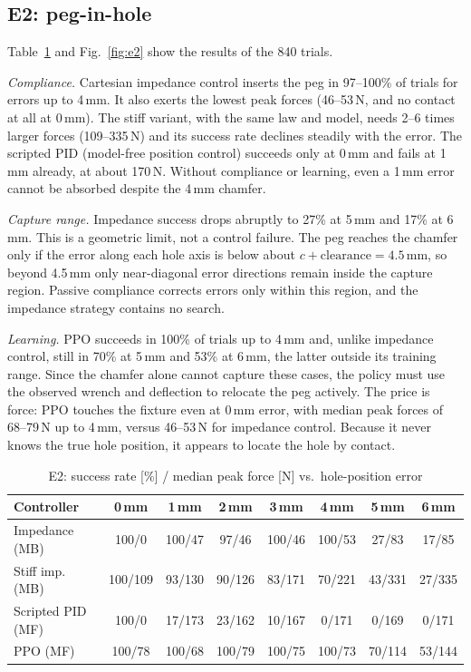 \documentclass[conference]{IEEEtran}
\newcommand{\todo}[1]{\textcolor{red}{[TODO: #1]}}
\begin{document}
\subsection{E2: peg-in-hole}
Table~\ref{tab:e2} and Fig.~\ref{fig:e2} show the results of the 840 trials.

\emph{Compliance.} Cartesian impedance control inserts the peg in 97--100\% of trials for errors up to 4\,mm. It also exerts the lowest peak forces (46--53\,N, and no contact at all at 0\,mm). The stiff variant, with the same law and model, needs 2--6 times larger forces (109--335\,N) and its success rate declines steadily with the error. The scripted PID (model-free position control) succeeds only at 0\,mm and fails at 1\,mm already, at about 170\,N. Without compliance or learning, even a 1\,mm error cannot be absorbed despite the 4\,mm chamfer.

\emph{Capture range.} Impedance success drops abruptly to 27\% at 5\,mm and 17\% at 6\,mm. This is a geometric limit, not a control failure. The peg reaches the chamfer only if the error along each hole axis is below about $c+\text{clearance}=4.5$\,mm, so beyond 4.5\,mm only near-diagonal error directions remain inside the capture region. Passive compliance corrects errors only within this region, and the impedance strategy contains no search.

\emph{Learning.} PPO succeeds in 100\% of trials up to 4\,mm and, unlike impedance control, still in 70\% at 5\,mm and 53\% at 6\,mm, the latter outside its training range. Since the chamfer alone cannot capture these cases, the policy must use the observed wrench and deflection to relocate the peg actively. The price is force: PPO touches the fixture even at 0\,mm error, with median peak forces of 68--79\,N up to 4\,mm, versus 46--53\,N for impedance control. Because it never knows the true hole position, it appears to locate the hole by contact.

\begin{table}[t]
\caption{E2: success rate [\%] / median peak force [N] vs.\ hole-position error}
\label{tab:e2}
\centering\scriptsize
\setlength{\tabcolsep}{2.4pt}
\begin{tabular}{lccccccc}
\toprule
Controller & 0\,mm & 1\,mm & 2\,mm & 3\,mm & 4\,mm & 5\,mm & 6\,mm \\
\midrule
Impedance (MB)      & 100/0   & 100/47  & 97/46  & 100/46 & 100/53 & 27/83  & 17/85 \\
Stiff imp. (MB)     & 100/109 & 93/130  & 90/126 & 83/171 & 70/221 & 43/331 & 27/335 \\
Scripted PID (MF)   & 100/0   & 17/173  & 23/162 & 10/167 & 0/171  & 0/169  & 0/171 \\
PPO (MF)            & 100/78  & 100/68  & 100/79 & 100/75 & 100/73 & 70/114 & 53/144 \\
\bottomrule
\end{tabular}
\end{table}
\end{document}
